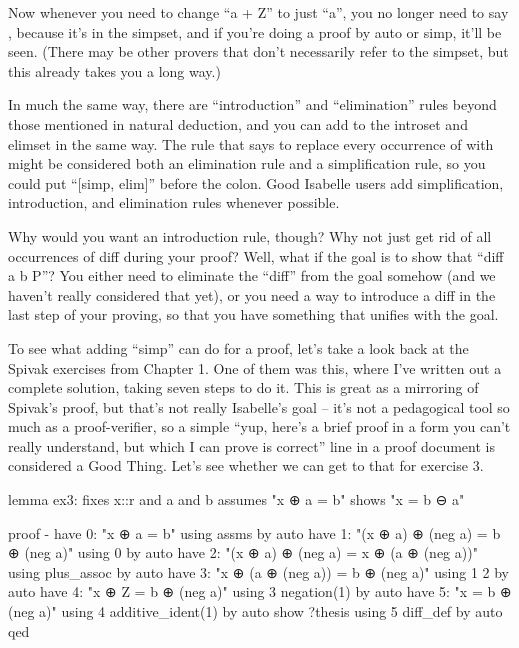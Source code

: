 Now whenever you need to change ``a + Z'' to just ``a'', you no longer need to say , because it's in the simpset, and if you're doing a proof by auto or simp, it'll be seen. (There may be other provers that don't necessarily refer to the simpset, but this already takes you a long way.)

In much the same way, there are ``introduction'' and ``elimination'' rules beyond those mentioned in natural deduction, and you can add to the introset and elimset in the same way. The rule that says to replace every occurrence of  with  might be considered both an elimination rule and a simplification rule, so you could put ``[simp, elim]'' before the colon. Good Isabelle users add simplification, introduction, and elimination rules whenever possible. 

Why would you want an introduction rule, though? Why not just get rid of all occurrences of diff during your proof? Well, what if the goal is to show that ``diff a b \in P''? You either need to eliminate the ``diff'' from the goal somehow (and we haven't really considered that yet), or you need a way to introduce a diff in the last step of your proving, so that you have something that unifies with the goal. 

To see what adding ``simp'' can do for a proof, let's take a look back at the Spivak exercises from Chapter 1. One of them was this, where I've written out a complete solution, taking seven steps to do it. This is great as a mirroring of Spivak's proof, but that's not really Isabelle's goal -- it's not a pedagogical tool so much as a proof-verifier, so a simple ``yup, here's a brief proof in a form you can't really understand, but which I can prove is correct'' line in a proof document is considered a Good Thing. Let's see whether we can get to that for exercise 3. 
\begin{IS}
    
lemma ex3: 
  fixes x::r and a and b
  assumes "x ⊕ a = b"
  shows "x = b ⊖ a"

proof -
  have 0: "x ⊕ a = b" using assms by auto
  have 1: "(x ⊕ a) ⊕ (neg a) = b ⊕ (neg a)" using 0 by auto
  have 2: "(x ⊕ a) ⊕ (neg a) = x ⊕ (a ⊕ (neg a))" using plus_assoc by auto
  have 3: "x ⊕ (a ⊕ (neg a)) = b ⊕ (neg a)" using 1 2 by auto
  have 4: "x ⊕ Z = b ⊕ (neg a)" using 3 negation(1) by auto
  have 5: "x = b ⊕ (neg a)" using 4 additive_ident(1) by auto
  show ?thesis using 5 diff_def by auto
qed
\end{IS}

